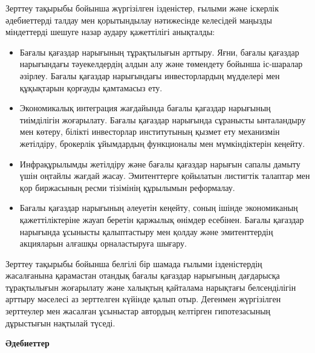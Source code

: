 \begin{multicols}{2}
Зерттеу тақырыбы бойынша жүргізілген ізденістер, ғылыми және іскерлік
әдебиеттерді талдау мен қорытындылау нәтижесінде келесідей маңызды
міндеттерді шешуге назар аудару қажеттілігі анықталды:

\begin{itemize}
\item
  Бағалы қағаздар нарығының тұрақтылығын арттыру. Яғни, бағалы қағаздар
  нарығындағы тәуекелдердің алдын алу және төмендету бойынша іс-шаралар
  әзірлеу. Бағалы қағаздар нарығындағы инвесторлардың мүдделері мен
  құқықтарын қорғауды қамтамасыз ету.
\item
  Экономикалық интеграция жағдайында бағалы қағаздар нарығының
  тиімділігін жоғарылату. Бағалы қағаздар нарығында сұранысты
  ынталандыру мен көтеру, білікті инвесторлар институтының қызмет ету
  механизмін жетілдіру, брокерлік ұйымдардың функционалы мен
  мүмкіндіктерін кеңейту.
\item
  Инфрақұрылымды жетілдіру және бағалы қағаздар нарығын сапалы дамыту
  үшін оңтайлы жағдай жасау. Эмитенттерге қойылатын листигтік талаптар
  мен қор биржасының ресми тізімінің құрылымын реформалау.
\item
  Бағалы қағаздар нарығының әлеуетін кеңейту, соның ішінде экономиканың
  қажеттіліктеріне жауап беретін қаржылық өнімдер есебінен. Бағалы
  қағаздар нарығында ұсынысты қалыптастыру мен қолдау және эмитенттердің
  акцияларын алғашқы орналастыруға шығару.
\end{itemize}

Зерттеу тақырыбы бойынша белгілі бір шамада ғылыми ізденістердің
жасалғанына қарамастан отандық бағалы қағаздар нарығының дағдарысқа
тұрақтылығын жоғарылату және халықтың қайталама нарықтағы белсенділігін
арттыру мәселесі аз зерттелген күйінде қалып отыр. Дегенмен жүргізілген
зерттеулер мен жасалған ұсыныстар автордың келтірген гипотезасының
дұрыстығын нақтылай түседі.
\end{multicols}

\begin{center}
{\bfseries Әдебиеттер}
\end{center}

